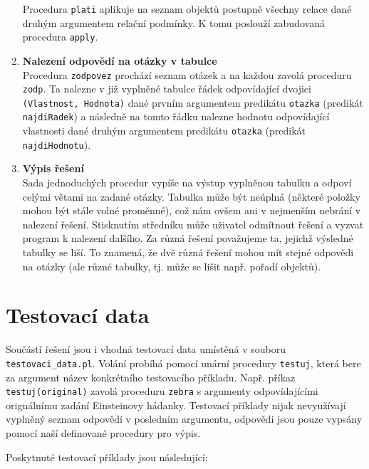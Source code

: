 \documentclass[11pt]{article} %
\begin{document}
\begin{enumerate}
Procedura \texttt{plati} aplikuje na seznam objektů postupně všechny relace dané druhým argumentem relační podmínky. K tomu poslouží zabudovaná procedura \texttt{apply}.

\item \textbf{Nalezení odpovědí na otázky v tabulce} \\
Procedura \texttt{zodpovez} prochází seznam otázek a na každou zavolá proceduru \texttt{zodp}. Ta nalezne v již vyplněné tabulce řádek odpovídající dvojici \texttt{(Vlastnost, Hodnota)} dané prvním argumentem predikátu \texttt{otazka} (predikát \texttt{najdiRadek}) a následně na tomto řádku nalezne hodnotu odpovídající vlastnosti dané druhým argumentem predikátu \texttt{otazka} (predikát \texttt{najdiHodnotu}).

\item \textbf{Výpis řešení} \\
Sada jednoduchých procedur vypíše na výstup vyplněnou tabulku a odpoví celými větami na zadané otázky. Tabulka může být neúplná (některé položky mohou být stále volné proměnné), což nám ovšem ani v nejmenším nebrání v nalezení řešení. Stisknutím středníku může uživatel odmítnout řešení a vyzvat program k nalezení dalšího. Za různá řešení považujeme ta, jejichž výsledné tabulky se liší. To znamená, že dvě různá řešení mohou mít stejné odpovědi na otázky (ale různé tabulky, tj. může se lišit např. pořadí objektů).

\end{enumerate}

\section{Testovací data}
Součástí řešení jsou i vhodná testovací data umístěná v souboru \texttt{testovaci\_data.pl}. Volání probíhá pomocí unární procedury \texttt{testuj}, která bere za argument název konkrétního testovacího příkladu. Např. příkaz \texttt{testuj(original)} zavolá proceduru \texttt{zebra} s argumenty odpovídajícími orignálnímu zadání Einsteinovy hádanky. Testovací příklady nijak nevyužívají vyplněný seznam odpovědí v posledním argumentu, odpovědi jsou pouze vypsány pomocí naší definované procedury pro výpis.

Poskytnuté testovací příklady jsou následující:
\end{document}
